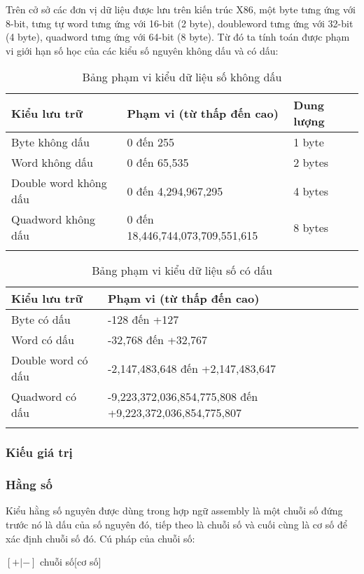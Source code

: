 		Trên cở sở các đơn vị dữ liệu được lưu trên kiến trúc X86, một byte tưng ứng với 8-bit, tưng tự word tưng ứng với 16-bit (2 byte), doubleword tưng ứng với 32-bit (4 byte), quadword tưng ứng với 64-bit (8 byte). Từ đó ta tính toán được phạm vi giới hạn số học của các kiểu số nguyên không dấu và có dấu: 
			\begin{longtable}{ | m{5cm} | m{6cm} | m{3cm} |}
			\hline
				Kiểu lưu trữ &	Phạm vi (từ thấp đến cao)&	Dung lượng\\
			\hline
			\hline
				Byte không dấu &	0 đến 255&	1 byte\\
			\hline
				Word không dấu	&0 đến 65,535&	2 bytes\\
			\hline
				Double word không dấu	 &0 đến 4,294,967,295&	4 bytes\\
			\hline
				Quadword không dấu	&0 đến 18,446,744,073,709,551,615&	8 bytes\\
			\hline
				\caption{Bảng phạm vi kiểu dữ liệu số không dấu}				
			\end{longtable}
		
			\begin{longtable}{ | m{5cm} | m{7cm} |}
			\hline
				Kiểu lưu trữ	& Phạm vi (từ thấp đến cao)\\
			\hline
			\hline
				Byte có dấu	& -128 đến +127\\
			\hline
				Word có dấu &	-32,768 đến +32,767\\
			\hline	
				Double word có dấu &	-2,147,483,648 đến +2,147,483,647\\
			\hline	
				Quadword có dấu	 & -9,223,372,036,854,775,808 đến +9,223,372,036,854,775,807 \\
			\hline
			\caption{Bảng phạm vi kiểu dữ liệu số có dấu}				
			\end{longtable}		
		
		\subsubsection{Kiếu giá trị}
		\subsubsection*{Hằng số}
		Kiểu hằng số nguyên được dùng trong hợp ngữ assembly là một chuỗi số đứng trước nó là dấu của số nguyên đó, tiếp theo là chuỗi số và cuối cùng là cơ số để xác định chuỗi số đó. Cú pháp của chuỗi số:		
		\begin{center}
			\selectfont
		 	$[{+|-}]$ chuỗi số$ [$cơ số$]$
		\end{center}
	
